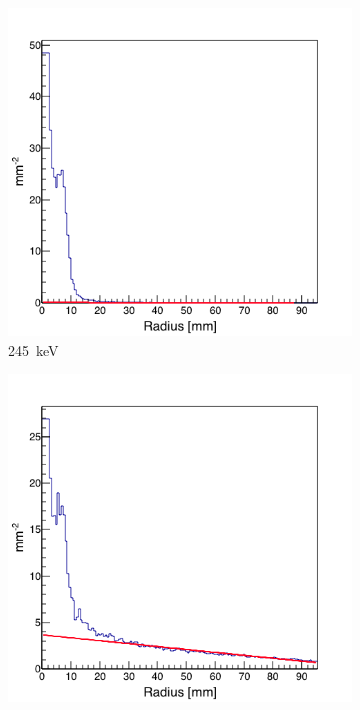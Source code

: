 \begin{figure}
\begin{subfigure}[b]{.5\textwidth}
  \centering
  \includegraphics[width=.9\linewidth]{03_GraphicFiles/chapter5_SPECTsimu/SPECT/anger/radial_distr/fit_245keV}
  \caption{245~keV}
  \label{fig:rad_distr_fit_245keV}
\end{subfigure}
\begin{subfigure}[b]{.5\textwidth}
  \centering
  \includegraphics[width=.9\linewidth]{03_GraphicFiles/chapter5_SPECTsimu/SPECT/anger/radial_distr/fit_555keV}

\end{subfigure}
\end{figure}
